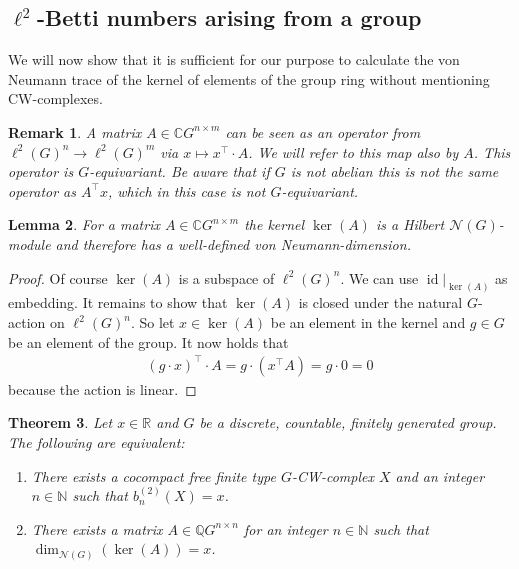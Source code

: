 \documentclass[12pt,a4paper]{scrartcl}
\theoremstyle{plain}
\newtheorem{Theorem}{Theorem}[subsection]
\newtheorem{Lemma}[Theorem]{Lemma}
\newtheorem{Remark}[Theorem]{Remark}
\theoremstyle{definition}
\newcommand{\C}{\mathbb{C}} %
\newcommand{\R}{\mathbb{R}} %
\newcommand{\Q}{\mathbb{Q}} %
\newcommand{\N}{\mathbb{N}} %
\newcommand{\2}{\mathbb{Z} / 2 \mathbb{Z}}
\newcommand{\1}{\bar{1}}
\newcommand{\0}{\bar{0}}
\newcommand{\id}{\operatorname{id}}
\begin{document}
\subsection{$\ell^2$-Betti numbers arising from a group}
We will now show that it is sufficient for our purpose to calculate the von Neumann trace of the kernel of elements of the group ring without mentioning CW-complexes.
\begin{Remark}\label{MAB}
	A matrix $A \in \C G^{n \times m}$ can be seen as an operator from $\ell^2(G)^n \to \ell^2(G)^m$ via $x \mapsto x^{\top} \cdot A$. We will refer to this map also by $A$. This operator is $G$-equivariant. Be aware that if $G$ is not abelian this is not the same operator as $A^\top x$, which in this case is not $G$-equivariant.
\end{Remark}
\begin{Lemma}
	For a matrix $A \in \C G^{n \times m}$ the kernel $\ker(A)$ is a Hilbert $\mathcal{N}(G)$-module and therefore has a well-defined von Neumann-dimension.
\end{Lemma}
\begin{proof}
	Of course $\ker(A)$ is a subspace of $\ell^2 (G)^n$. We can use $\id|_{\ker(A)}$ as embedding. It remains to show that $\ker(A)$ is closed under the natural $G$-action on $\ell^2 (G)^n$. So let $x \in \ker(A)$ be an element in the kernel and $g \in G$ be an element of the group. It now holds that
	\begin{align*}
		(g \cdot x)^\top \cdot A = g \cdot (x^\top A) = g \cdot 0 = 0
	\end{align*}
	because the action is linear.
\end{proof}
\begin{Theorem} \label{MCW}
	Let $x \in \R$ and $G$ be a discrete, countable, finitely generated group. The following are equivalent:
	\begin{enumerate}
		\item There exists a cocompact free finite type $G$-CW-complex $X$ and an integer $n \in \N$ such that $b_n^{(2)}(X)=x$.
		\item There exists a matrix $A \in \Q G^{n \times n}$ for an integer $n \in \N$ such that \newline $\dim_{\mathcal{N}(G)}(\ker (A))=x$.
	\end{enumerate}
\end{Theorem}
\end{document}
